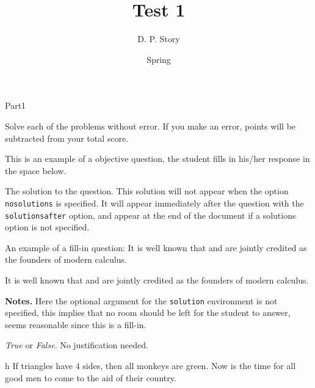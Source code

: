 \documentclass[12pt]{article}
\title[T1]{Test 1}
\author{D. P. Story}
\date{Spring \the\year}
\begin{document}
\maketitle


\begin{exam}[Part I.]{Part1}

\begin{instructions}[Part I.]
Solve each of the problems without error. If you make an error,
points will be subtracted from your total score.
\end{instructions}

\begin{problem}[5]
This is an example of a objective question, the student fills in
his/her response in the space below.

\begin{solution}[.5in]
The solution to the question. This solution will not appear when
the option \texttt{nosolutions} is specified. It will appear
immediately after the question with the \texttt{solutionsafter}
option, and appear at the end of the document if a solutions
option is not specified.
\end{solution}
\end{problem}


\begin{problem}[5]
An example of a fill-in question:
It is well known that  and
 are jointly credited as the founders of
modern calculus.

\begin{solution}
It is well known that  and  are
jointly credited as the founders of modern calculus.

\medskip\noindent\textbf{Notes.} Here the optional argument for
the \texttt{solution} environment is not specified, this implies
that no room should be left for the student to answer, seems
reasonable since this is a fill-in.
\end{solution}
\end{problem}

\begin{problem*}[2ea]
\textit{True} or \textit{False}.  No justification needed.

\fillinWidth{}

\begin{parts}

    \item[h]  If triangles have $4$ sides, then all monkeys
    are green. Now is the time for all good men to come to the aid
    of their country.


\end{parts}
\end{problem*}
\end{exam}
\end{document}
